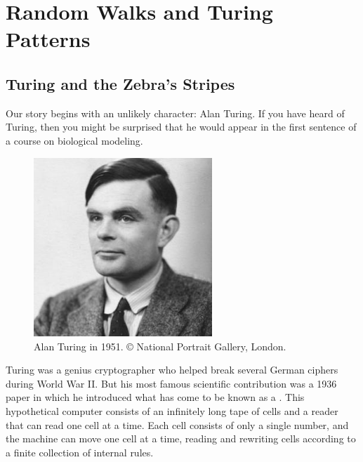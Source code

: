 \chapter[Random Walks and Turing Patterns]{Random Walks and Turing Patterns}
\label{chapter:turing}
\renewcommand{\chaptertitle}{Finding Motifs in Transcription Factor Networks}


\FloatBarrier

\section{Turing and the Zebra’s Stripes}
\label{sec:introduction}

Our story begins with an unlikely character: Alan Turing. If you have heard of Turing, then you might be surprised that he would appear in the first sentence of a course on biological modeling.

\begin{figure}[h]
\centering
\mySfFamily
\includegraphics[width = 0.6\textwidth]{../assets/images/600px/alan_turing_npg_cc.jpg}
\caption{Alan Turing in 1951. © National Portrait Gallery, London.}
\label{fig:alan_turing_npg_cc}
\end{figure}

Turing was a genius cryptographer who helped break several German ciphers during World War II. But his most famous scientific contribution was a 1936 paper in which he introduced what has come to be known as a . This hypothetical computer consists of an infinitely long tape of cells and a reader that can read one cell at a time. Each cell consists of only a single number, and the machine can move one cell at a time, reading and rewriting cells according to a finite collection of internal rules.

